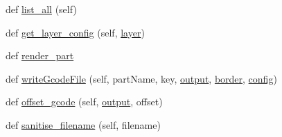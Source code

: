 \begin{DoxyCompactItemize}
def \hyperlink{classpath_1_1_plane_a292f4f9b0135fec614b9310213977ccb}{list\+\_\+all} (self)
\item 
def \hyperlink{classpath_1_1_plane_a8d5bd7c7a44335da1c32db64110734d0}{get\+\_\+layer\+\_\+config} (self, \hyperlink{classpath_1_1_part_aa1d9912dfa1d7e3222df898d2a18786f}{layer})
\item 
def \hyperlink{classpath_1_1_plane_a2405b1700e1eaf4dcf4b992c207bfb2a}{render\+\_\+part}
\item 
def \hyperlink{classpath_1_1_plane_a1716fc0cf4fb6f62ec5ea76d59b1ea67}{write\+Gcode\+File} (self, part\+Name, key, \hyperlink{classpath_1_1_part_a6ff6c586832ff637508796a8a77dbbac}{output}, \hyperlink{classpath_1_1_part_a004c78655a7f215ff512e4b18e48b0fe}{border}, \hyperlink{classpath_1_1_plane_a9c3565a0c72c585ffd3d9305d9e59b64}{config})
\item 
def \hyperlink{classpath_1_1_plane_a9de8b4b12f301c25e9919ab0cc488df9}{offset\+\_\+gcode} (self, \hyperlink{classpath_1_1_part_a6ff6c586832ff637508796a8a77dbbac}{output}, offset)
\item 
def \hyperlink{classpath_1_1_plane_af067e53069dc33b30e194aaa04e28235}{sanitise\+\_\+filename} (self, filename)
\end{DoxyCompactItemize}
